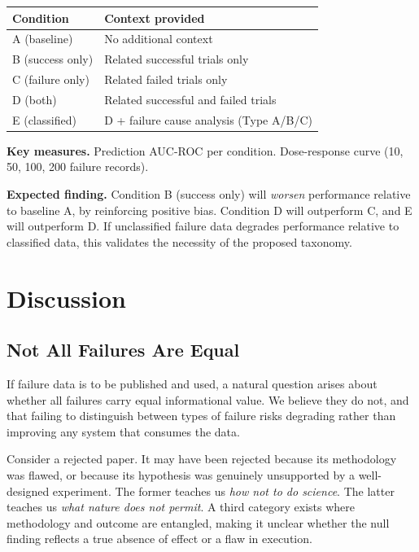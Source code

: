 \begin{table}[h]
\centering
\begin{tabular}{ll}
\toprule
\textbf{Condition} & \textbf{Context provided} \\
\midrule
A (baseline)     & No additional context \\
B (success only) & Related successful trials only \\
C (failure only) & Related failed trials only \\
D (both)         & Related successful and failed trials \\
E (classified)   & D + failure cause analysis (Type A/B/C) \\
\bottomrule
\end{tabular}
\end{table}

\textbf{Key measures.} Prediction AUC-ROC per condition.
Dose-response curve (10, 50, 100, 200 failure records).

\textbf{Expected finding.} Condition B (success only) will
\textit{worsen} performance relative to baseline A, by reinforcing
positive bias. Condition D will outperform C, and E will outperform
D. If unclassified failure data degrades performance relative to
classified data, this validates the necessity of the proposed
taxonomy.

\section{Discussion}
\label{sec:discussion}

\subsection{Not All Failures Are Equal}

If failure data is to be published and used, a natural question
arises about whether all failures carry equal informational value.
We believe they do not, and that failing to distinguish between
types of failure risks degrading rather than improving any system
that consumes the data.

Consider a rejected paper. It may have been rejected because its
methodology was flawed, or because its hypothesis was genuinely
unsupported by a well-designed experiment. The former teaches us
\textit{how not to do science}. The latter teaches us \textit{what
nature does not permit}. A third category exists where methodology
and outcome are entangled, making it unclear whether the null
finding reflects a true absence of effect or a flaw in execution.


